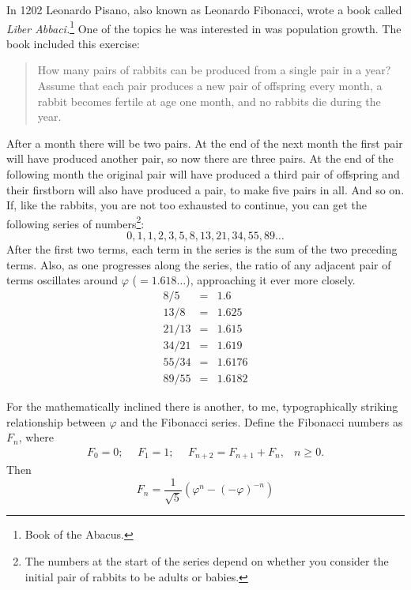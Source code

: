 \documentclass[10pt,letterpaper,extrafontsizes]{memoir}
\begin{document}
    In 1202 Leonardo Pisano, 
also known as Leonardo Fibonacci, wrote a
book called \textit{Liber Abbaci.}\footnote{Book of the Abacus.} One of the 
topics he was interested in was population growth. The book included
this exercise: 
\begin{quote}
How many pairs of rabbits can be produced from a single 
pair in a year?
Assume that each pair produces a new pair of offspring every month,
a rabbit becomes fertile at age one month, and no rabbits die during the
year.
\end{quote}
After a month there will be two pairs. At the end of the next month the
first pair will have produced another pair, so now there are three pairs.
At the end of the following  month the original pair will have produced a
third pair of offspring and their firstborn will also have produced a pair, 
to make five pairs in all. And so on. 
If, like the rabbits, you are not too exhausted
to continue, you can get the following series of 
numbers\footnote{The numbers at the start of the series
depend on whether you consider the initial pair of rabbits to be adults or 
babies.\label{fn:rabbits}}:
\begin{displaymath}
0,1,1,2,3,5,8,13,21,34, 55, 89 \ldots
\end{displaymath}
After the first two terms, each term in the series is the sum of the two
preceding terms. Also, as one progresses along the series, the ratio of
any adjacent pair of terms oscillates around $\varphi$ ($= 1.618 \ldots$),
approaching it ever more closely.
\begin{eqnarray*}
  8/5 & = & 1.6 \\
  13/8 & = & 1.625 \\
  21/13 & = & 1.615 \\
  34/21 & = & 1.619 \\
  55/34 & = & 1.6176 \\
  89/55 & = & 1.6182
\end{eqnarray*}

    For the mathematically inclined there is another, to me, typographically
striking
relationship between $\varphi$ and the Fibonacci series. Define the
Fibonacci numbers as $F_{n}$, where
\begin{equation}
\begin{array}{cccc}
F_{0} = 0;\ \ & F_{1}=1;\ \ & F_{n+2}=F_{n+1} + F_{n},  &  n \geq 0.
\end{array}
\end{equation}
Then
\begin{equation}
 F_{n} = \frac{1}{\sqrt{5}}(\varphi^{n} - (- \varphi)^{-n})
\end{equation}
\end{document}
